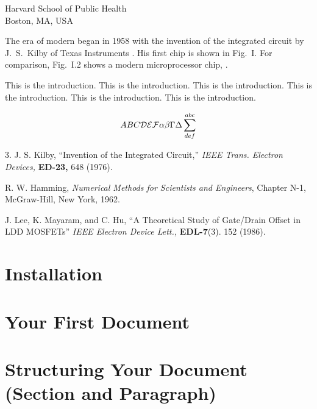 \documentclass{wileySix}
\begin{document}
\begin{introduction}


{Harvard School of Public Health\\
Boston, MA, USA}

The era of modern  
began in 1958 with the invention of the
integrated circuit by J.~S.~Kilby
 of Texas Instruments \cite{kilby}.
His first chip is shown in Fig.~I. For comparison,
Fig.~I.2 shows a modern microprocessor chip, \cite{beren}.


This is the introduction.
This is the introduction.
This is the introduction.
This is the introduction.
This is the introduction.
This is the introduction.

\begin{equation}
ABC {\cal DEF} \alpha\beta\Gamma\Delta\sum^{abc}_{def}
\end{equation}


\begin{chapreferences}{3.}
J. S. Kilby,
``Invention of the Integrated Circuit,'' {\it IEEE Trans. Electron Devices,}
{\bf ED-23,} 648 (1976).

R. W. Hamming,
                 {\it Numerical Methods for Scientists and 
                 Engineers}, Chapter N-1, McGraw-Hill, 
                 New York, 1962.

J. Lee, K. Mayaram, and C. Hu, ``A Theoretical
               Study of Gate/Drain Offset in LDD MOSFETs''
                     {\it IEEE Electron Device Lett.,} {\bf EDL-7}(3). 152 
                     (1986).
\end{chapreferences}
\end{introduction}

\chapter{Installation}


\chapter{Your First Document}


\chapter{Structuring Your Document (Section and Paragraph)}
\end{document}
